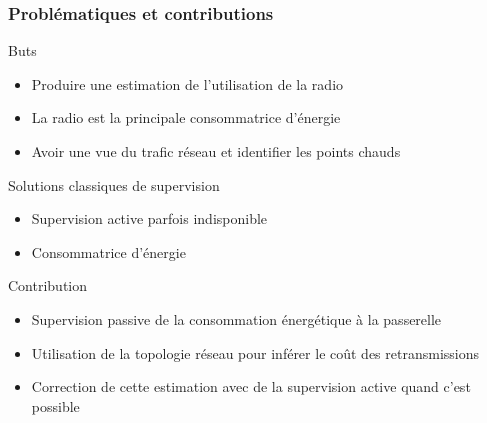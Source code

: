 \begin{frame}\frametitle{Problématiques et contributions}

  \begin{block}{Buts}
    \begin{itemize}
      \item Produire une estimation de l'utilisation de la radio
      \item La radio est la principale consommatrice d'énergie
      \item Avoir une vue du trafic réseau et identifier les points chauds
    \end{itemize}
  \end{block}

  \begin{block}{Solutions classiques de supervision}
    \begin{itemize}
      \item Supervision active parfois indisponible
      \item Consommatrice d'énergie %
    \end{itemize}
  \end{block}

  \begin{alertblock}{Contribution}
    \begin{itemize}
      \item Supervision passive de la consommation énergétique à la passerelle
      \item Utilisation de la topologie réseau pour inférer le coût des retransmissions
      \item Correction de cette estimation avec de la supervision active quand c'est possible
    \end{itemize}
  \end{alertblock}

\end{frame}

